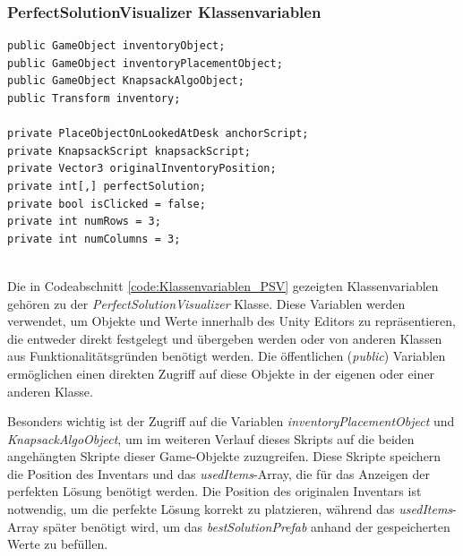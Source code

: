 \subsubsection{PerfectSolutionVisualizer Klassenvariablen}
\begin{lstlisting}[style=csharp, caption={Klassenvariablen des PerfectSolutionVisualizer}, label=code:Klassenvariablen_PSV]
public GameObject inventoryObject;
public GameObject inventoryPlacementObject;
public GameObject KnapsackAlgoObject;
public Transform inventory;

private PlaceObjectOnLookedAtDesk anchorScript;
private KnapsackScript knapsackScript;
private Vector3 originalInventoryPosition;
private int[,] perfectSolution;
private bool isClicked = false;
private int numRows = 3;
private int numColumns = 3;
\end{lstlisting}\\
Die in Codeabschnitt \ref{code:Klassenvariablen_PSV} gezeigten Klassenvariablen gehören zu der \textit{PerfectSolutionVisualizer}
Klasse. Diese Variablen werden verwendet, um Objekte und Werte innerhalb des Unity Editors zu repräsentieren, die entweder
direkt festgelegt und übergeben werden oder von anderen Klassen aus Funktionalitätsgründen benötigt werden. Die
öffentlichen (\textit{public}) Variablen ermöglichen einen direkten Zugriff auf diese Objekte in der eigenen oder einer
anderen Klasse.

Besonders wichtig ist der Zugriff auf die Variablen \textit{inventoryPlacementObject} und \textit{KnapsackAlgoObject}, um
im weiteren Verlauf dieses Skripts auf die beiden angehängten Skripte dieser Game-Objekte zuzugreifen. Diese Skripte
speichern die Position des Inventars und das \textit{usedItems}-Array, die für das Anzeigen der perfekten Lösung benötigt
werden. Die Position des originalen Inventars ist notwendig, um die perfekte Lösung korrekt zu platzieren, während das
\textit{usedItems}-Array später benötigt wird, um das \textit{bestSolutionPrefab} anhand der gespeicherten Werte zu befüllen.

